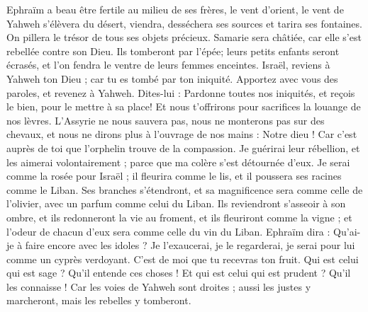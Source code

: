 \begin{multicols}{2}
Ephraïm a beau être fertile au milieu de ses frères, le vent d'orient, le vent de Yahweh s'élèvera du désert, viendra, desséchera ses sources et tarira ses fontaines. On pillera le trésor de tous ses objets précieux.
Samarie sera châtiée, car elle s'est rebellée contre son Dieu. Ils tomberont par l'épée; leurs petits enfants seront écrasés, et l'on fendra le ventre de leurs femmes enceintes.
\VerseOne{}Israël, reviens à Yahweh ton Dieu ; car tu es tombé par ton iniquité.
Apportez avec vous des paroles, et revenez à Yahweh. Dites-lui : Pardonne toutes nos iniquités, et reçois le bien, pour le mettre à sa place! Et nous t'offrirons pour sacrifices la louange de nos lèvres.
L'Assyrie ne nous sauvera pas, nous ne monterons pas sur des chevaux, et nous ne dirons plus à l'ouvrage de nos mains : Notre dieu ! Car c'est auprès de toi que l'orphelin trouve de la compassion.
Je guérirai leur rébellion, et les aimerai volontairement ; parce que ma colère s'est détournée d'eux.
Je serai comme la rosée pour Israël ; il fleurira comme le lis, et il poussera ses racines comme le Liban.
Ses branches s'étendront, et sa magnificence sera comme celle de l'olivier, avec un parfum comme celui du Liban.
Ils reviendront s'asseoir à son ombre, et ils redonneront la vie au froment, et ils fleuriront comme la vigne ; et l'odeur de chacun d'eux sera comme celle du vin du Liban.
Ephraïm dira : Qu'ai-je à faire encore avec les idoles ? Je l'exaucerai, je le regarderai, je serai pour lui comme un cyprès verdoyant. C'est de moi que tu recevras ton fruit.
Qui est celui qui est sage ? Qu'il entende ces choses ! Et qui est celui qui est prudent ? Qu'il les connaisse ! Car les voies de Yahweh sont droites ; aussi les justes y marcheront, mais les rebelles y tomberont.
\PPE{}
\end{multicols}
